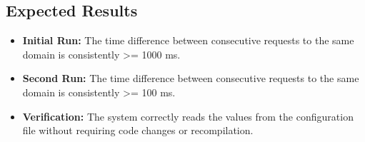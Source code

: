 \documentclass{article}
\begin{document}
\subsection*{Expected Results}
\begin{itemize}
    \item \textbf{Initial Run:} The time difference between consecutive requests to the same domain is consistently >= 1000 ms. 
    \item \textbf{Second Run:} The time difference between consecutive requests to the same domain is consistently >= 100 ms. 
    \item \textbf{Verification:} The system correctly reads the values from the configuration file without requiring code changes or recompilation. 
\end{itemize}
\end{document}
